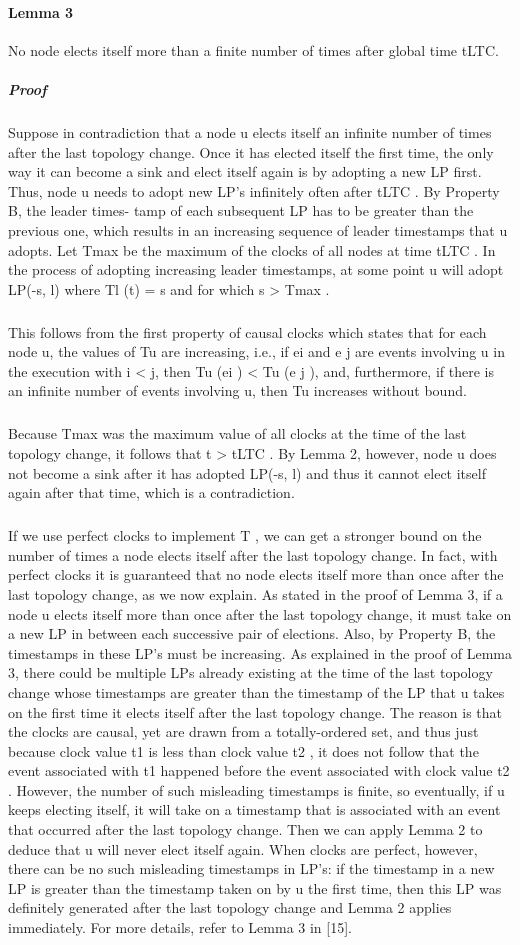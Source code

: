 \paragraph{Lemma 3}No node elects itself more than a finite number of times after global time tLTC.
\subparagraph{Proof}Suppose in contradiction that a node u elects itself an infinite number of times after the last topology change. Once it has elected itself the first time, the only way it can become a sink and elect itself again is by adopting a new LP first. Thus, node u needs to adopt new LP's infinitely often after tLTC . By Property B, the leader times- tamp of each subsequent LP has to be greater than the previous one, which results in an increasing sequence of leader timestamps that u adopts. Let Tmax be the maximum of the clocks of all nodes at time tLTC . In the process of adopting increasing leader timestamps, at some point u will adopt LP(-s, l) where Tl (t) = s and for which s > Tmax .
\subparagraph{}This follows from the first property of causal clocks which states that for each node u, the values of Tu are increasing, i.e., if ei and e j are events involving u in the execution with i < j, then Tu (ei ) < Tu (e j ), and, furthermore, if there is an infinite number of events involving u, then Tu increases without bound. 
\subparagraph{}Because Tmax was the maximum value of all clocks at the time of the last topology change, it follows that t > tLTC . By Lemma 2, however, node u does not become a sink after it has adopted LP(-s, l) and thus it cannot elect itself again after that time, which is a contradiction.
\subparagraph{}If we use perfect clocks to implement T , we can get a stronger bound on the number of times a node elects itself after the last topology change. In fact, with perfect clocks it is guaranteed that no node elects itself more than once after the last topology change, as we now explain. As stated in the proof of Lemma 3, if a node u elects itself more than once after the last topology change, it must take on a new LP in between each successive pair of elections. Also, by Property B, the timestamps in these LP's must be increasing. As explained in the proof of Lemma 3, there could be multiple LPs already existing at the time of the last topology change whose timestamps are greater than the timestamp of the LP that u takes on the first time it elects itself after the last topology change. The reason is that the clocks are causal, yet are drawn from a totally-ordered set, and thus just because clock value t1 is less than clock value t2 , it does not follow that the event associated with t1 happened before the event associated with clock value t2 . However, the number of such misleading timestamps is finite, so eventually, if u keeps electing itself, it will take on a timestamp that is associated with an event that occurred after the last topology change. Then we can apply Lemma 2 to deduce that u will never elect itself again. When clocks are perfect, however, there can be no such misleading timestamps in LP's: if the timestamp in a new LP is greater than the timestamp taken on by u the first time, then this LP was definitely generated after the last topology change and Lemma 2 applies immediately. For more details, refer to Lemma 3 in [15].
